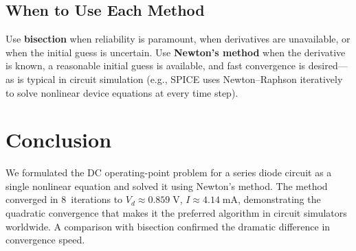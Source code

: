 \documentclass[letterpaper,twocolumn,fleqn]{article}
\begin{document}
\subsection{When to Use Each Method}
Use \textbf{bisection} when reliability is paramount, when derivatives are
unavailable, or when the initial guess is uncertain.  Use \textbf{Newton's
method} when the derivative is known, a reasonable initial guess is available,
and fast convergence is desired---as is typical in circuit simulation (e.g.,
SPICE uses Newton--Raphson iteratively to solve nonlinear device equations at
every time step).

\section{Conclusion}

We formulated the DC operating-point problem for a series diode circuit as a
single nonlinear equation and solved it using Newton's method.  The method
converged in 8~iterations to $V_d \approx 0.859\;\text{V}$,
$I \approx 4.14\;\text{mA}$, demonstrating the quadratic convergence that
makes it the preferred algorithm in circuit simulators worldwide.  A comparison
with bisection confirmed the dramatic difference in convergence speed.
\end{document}
